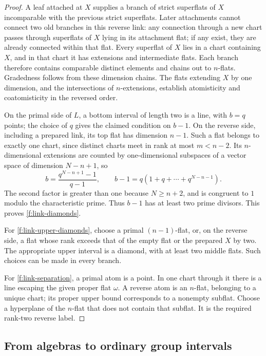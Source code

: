 \begin{proof}
A leaf attached at $X$ supplies a branch of strict superflats of $X$
incomparable with the previous strict superflats. Later attachments cannot
connect two old branches in this reverse link: any connection through a
new chart passes through superflats of $X$ lying in its attachment flat;
if any exist, they are already connected within that flat. Every
superflat of $X$ lies in a chart containing $X$, and in that chart it has
extensions and intermediate flats. Each branch therefore contains
comparable distinct elements and chains out to $n$-flats. Gradedness follows
from these dimension chains. The flats extending $X$ by one dimension, and
the intersections of $n$-extensions, establish atomisticity and
coatomisticity in the reversed order.

On the primal side of $L$, a bottom interval of length two is a line, with
$b=q$ points; the choice of $q$ gives the claimed condition on $b-1$.
On the reverse side, including a prepared link, its top flat has dimension
$n-1$. Such a flat belongs to exactly one chart, since distinct charts meet
in rank at most $m<n-2$. Its $n$-dimensional extensions are counted by
one-dimensional subspaces of a vector space of dimension $N-n+1$, so
\[
 b=\frac{q^{N-n+1}-1}{q-1},\qquad
 b-1=q(1+q+\cdots+q^{N-n-1}).
\]
The second factor is greater than one because $N\ge n+2$, and is congruent
to $1$ modulo the characteristic prime. Thus $b-1$ has at least two prime
divisors. This proves \ref{f:link-diamonds}.

For \ref{f:link-upper-diamonds}, choose a primal $(n-1)$-flat, or, on the
reverse side, a flat whose rank exceeds that of the empty flat or the
prepared $X$ by two. The appropriate upper interval is a diamond, with at
least two middle flats. Such choices can be made in every branch.

For \ref{f:link-separation}, a primal atom is a point. In one chart through
it there is a line escaping the given proper flat $\omega$. A reverse atom
is an $n$-flat, belonging to a unique chart; its proper upper bound
corresponds to a nonempty subflat. Choose a hyperplane of the $n$-flat that
does not contain that subflat. It is the required rank-two reverse label.
\end{proof}

\subsection{From algebras to ordinary group intervals}

